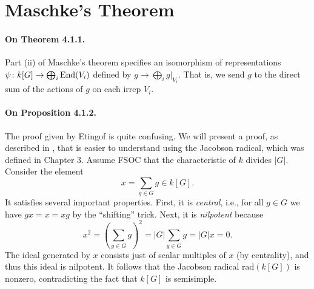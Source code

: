 \documentclass[oneside]{scrbook}
\begin{document}
\section{Maschke's Theorem}
\paragraph{On Theorem 4.1.1.} Part (ii) of Maschke's theorem specifies an isomorphism of representations $\psi\colon k[G]\to \bigoplus_i \operatorname{End}(V_i)$ defined by $g\to \bigoplus_i g\vert_{V_i}$. That is, we send $g$ to the direct sum of the actions of $g$ on each irrep $V_i$. 

\paragraph{On Proposition 4.1.2.} The proof given by Etingof is quite confusing. 
We will present a proof, as described in \cite{1133054}, that is easier to understand using the Jacobson radical, which was defined in Chapter 3. Assume FSOC that the characteristic of $k$ divides $|G|$. Consider the element
\[x=\sum_{g\in G}g\in k[G].\]
It satisfies several important properties. First, it is \emph{central}, i.e., for all $g\in G$ we have $gx=x=xg$ by the ``shifting'' trick. Next, it is \emph{nilpotent} because
\[x^2=\left(\sum_{g\in G}g\right)^2=|G|\sum_{g\in G}g=|G|x=0.\]
The ideal generated by $x$ consists just of scalar multiples of $x$ (by centrality), and thus this ideal is nilpotent. It follows that the Jacobson radical $\text{rad}(k[G])$ is nonzero, contradicting the fact that $k[G]$ is semisimple.
\end{document}
